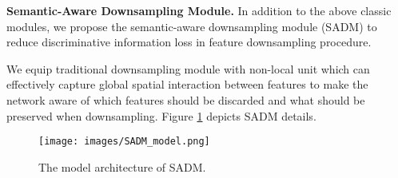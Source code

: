 \documentclass[final]{cvpr}
\begin{document}
\textbf{Semantic-Aware Downsampling Module.}
In addition to the above classic modules, we propose the semantic-aware downsampling module (SADM) to reduce discriminative information loss in feature downsampling procedure.

We equip traditional downsampling module with non-local \cite{wang2018non} unit which can effectively capture global spatial interaction between features to make the network aware of which features should be discarded and what should be preserved when downsampling. Figure \ref{fig.SADM_model} depicts SADM details.

\begin{figure}[ht]
\centering
  \texttt{[image: images/SADM\_model.png]}
\centering
\caption{The model architecture of SADM.}
\label{fig.SADM_model}
\end{figure}
\end{document}

